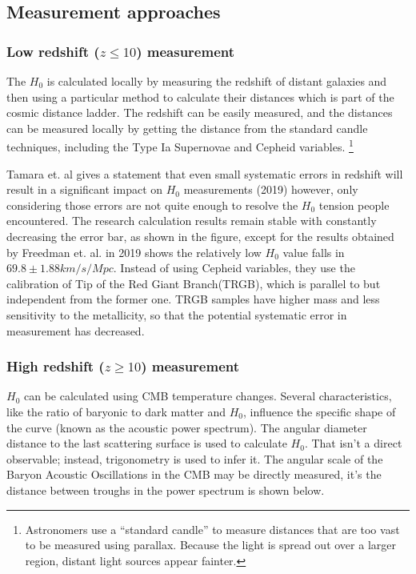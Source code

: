 \subsection{\label{sec:level2}Measurement approaches}

\subsubsection{\label{sec:level3} Low redshift ($z \leq 10$) measurement}

The $H_0$ is calculated locally by measuring the redshift of distant galaxies and then using a particular method to calculate their distances which is part of the cosmic distance ladder.
The redshift can be easily measured, and the distances can be measured locally by getting the distance from the standard candle techniques, including the Type Ia Supernovae and Cepheid variables.
 \footnote{Astronomers use a “standard candle” to measure distances that are too vast to be measured using parallax. Because the light is spread out over a larger region, distant light sources appear fainter.}

Tamara et. al gives a statement that even small systematic errors in redshift will result in a significant impact on $H_0$ measurements (2019)\; however, only considering those errors are not quite enough to resolve the $H_0$ tension people encountered. The research calculation results remain stable with constantly decreasing the error bar, as shown in the figure, except for the results obtained by Freedman et. al. in 2019 shows the relatively low $H_0$ value falls in $69.8 \pm 1.88 km/s/Mpc$. Instead of using Cepheid variables, they use the calibration of Tip of the Red Giant Branch(TRGB), which is parallel to but independent from the former one. TRGB samples have higher mass and less sensitivity to the metallicity, so that the potential systematic error in measurement has decreased.

\subsubsection{\label{sec:level 13} High redshift ($z \geq 10$) measurement}

$H_0$ can be calculated using CMB temperature changes. Several characteristics, like the ratio of baryonic to dark matter and $H_0$, influence the specific shape of the curve (known as the acoustic power spectrum). The angular diameter distance to the last scattering surface is used to calculate $H_0$. That isn’t a direct observable; instead, trigonometry is used to infer it. The angular scale of the Baryon Acoustic Oscillations in the CMB may be directly measured, it’s the distance between troughs in the power spectrum is shown below.

